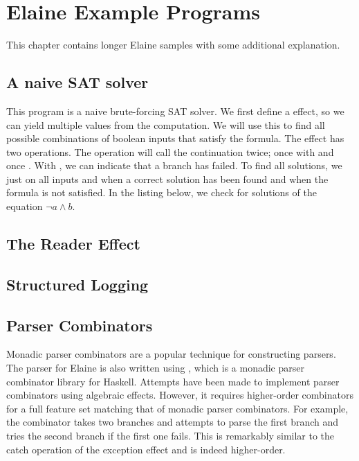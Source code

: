 \chapter{Elaine Example Programs}\label{chap:examples}

This chapter contains longer Elaine samples with some additional explanation.

\section{A naive SAT solver}\label{sec:sat}

This program is a naive brute-forcing SAT solver. We first define a  effect, so we can yield multiple values from the computation. We will use this to find all possible combinations of boolean inputs that satisfy the formula. The  effect has two operations. The  operation will call the continuation twice; once with  and once . With , we can indicate that a branch has failed. To find all solutions, we just  on all inputs and  when a correct solution has been found and  when the formula is not satisfied. In the listing below, we check for solutions of the equation $\neg a \wedge b$.


\section{The Reader Effect}\label{sec:reader}



\section{Structured Logging}



\section{Parser Combinators}

Monadic parser combinators \autocite{hutton_monadic_1996} are a popular technique for constructing parsers. The parser for Elaine is also written using , which is a monadic parser combinator library for Haskell. Attempts have been made to implement parser combinators using algebraic effects. However, it requires higher-order combinators for a full feature set matching that of monadic parser combinators. For example, the  combinator takes two branches and attempts to parse the first branch and tries the second branch if the first one fails. This is remarkably similar to the catch operation of the exception effect and is indeed higher-order.

